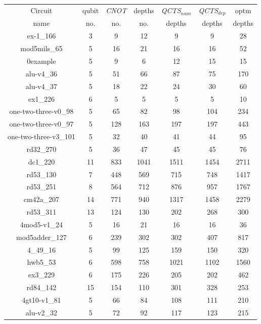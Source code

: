 \documentclass[runningheads]{llncs}
\begin{document}
						\begin{table}[H]
							\begin{center}  
							\begin{tabular}{|c|c|c|c|c|c|c|}
							\hline
							Circuit &  qubit  & \textit{CNOT} &depths &\textit{QCTS$_{num}$}& \textit{QCTS$_{dep}$}  & optm 	  	\\
							 name	&   no. 	&	no. & no. & depths&  depths &  depths 	\\
							\hline
							ex-1\_166 & 3 & 9 & 12 & 9 & 9 & 28 \\
							mod5mils\_65 & 5 & 16 & 21 & 16 & 16 & 52 \\
							0example & 5 & 9 & 6 & 12 & 15 & 15 \\
							alu-v4\_36 & 5 & 51 & 66 & 87 & 75 & 170 \\
							alu-v4\_37 & 5 & 18 & 22 & 24 & 30 & 60 \\
							ex1\_226 & 6 & 5 & 5 & 5 & 5 & 10 \\
							one-two-three-v0\_98 & 5 & 65 & 82 & 98 & 104 & 234 \\
							one-two-three-v0\_97 & 5 & 128 & 163 & 197 & 197 & 443 \\
							one-two-three-v3\_101 & 5 & 32 & 40 & 41 & 44 & 95 \\
							rd32\_270 & 5 & 36 & 47 & 45 & 45 & 76 \\
							dc1\_220 & 11 & 833 & 1041 & 1511 & 1454 & 2711 \\
							rd53\_130 & 7 & 448 & 569 & 715 & 748 & 1417 \\
							rd53\_251 & 8 & 564 & 712 & 876 & 957 & 1767 \\
							cm42a\_207 & 14 & 771 & 940 & 1317 & 1458 & 2279 \\
							rd53\_311 & 13 & 124 & 130 & 202 & 268 & 300 \\
							4mod5-v1\_24 & 5 & 16 & 21 & 16 & 16 & 36 \\
							mod5adder\_127 & 6 & 239 & 302 & 302 & 407 & 817 \\
							4\_49\_16 & 5 & 99 & 125 & 159 & 150 & 320 \\
							hwb5\_53 & 6 & 598 & 758 & 1021 & 1102 & 1560 \\
							ex3\_229 & 6 & 175 & 226 & 205 & 202 & 462 \\
							rd84\_142 & 15 & 154 & 110 & 301 & 328 & 253 \\
							4gt10-v1\_81 & 5 & 66 & 84 & 108 & 111 & 210 \\
							alu-v2\_32 & 5 & 72 & 92 & 117 & 123 & 215 \\

\end{tabular}
\end{center}
\end{table}
\end{document}
